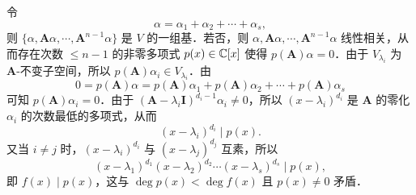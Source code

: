 \begin{solution}
令
\[
\alpha=\alpha_{1}+\alpha_{2}+\cdots+\alpha_{s},
\]
则 $\{\alpha,\bm{A}\alpha,\cdots,\bm{A}^{n-1}\alpha\}$ 是 $V$ 的一组基．若否，则 $\alpha,\bm{A}\alpha,\cdots,\bm{A}^{n-1}\alpha$ 线性相关，从而存在次数 $\le n-1$ 的非零多项式 $p(x)\in\mathbb{C}[x]$ 使得 $p(\bm{A})\alpha=0$．由于 $V_{\lambda_{i}}$ 为 $\bm{A}$-不变子空间，所以 $p(\bm{A})\alpha_{i}\in V_{\lambda_{i}}$．由
\[
0=p(\bm{A})\alpha=p(\bm{A})\alpha_{1}+p(\bm{A})\alpha_{2}+\cdots+p(\bm{A})\alpha_{s}
\]
可知 $p(\bm{A})\alpha_{i}=0$．由于 $(\bm{A}-\lambda_{i}\bm{I})^{d_{i}-1}\alpha_{i}\ne 0$，所以 $(x-\lambda_{i})^{d_{i}}$ 是 $\bm{A}$ 的零化 $\alpha_{i}$ 的次数最低的多项式，从而
\[
(x-\lambda_{i})^{d_{i}}\mid p(x).
\]
又当 $i\ne j$ 时，$(x-\lambda_{i})^{d_{i}}$ 与 $(x-\lambda_{j})^{d_{j}}$ 互素，所以
\[
(x-\lambda_{1})^{d_{1}}(x-\lambda_{2})^{d_{2}}\cdots(x-\lambda_{s})^{d_{s}}\mid p(x),
\]
即 $f(x)\mid p(x)$，这与 $\deg p(x)<\deg f(x)$ 且 $p(x)\ne 0$ 矛盾．
\end{solution}

